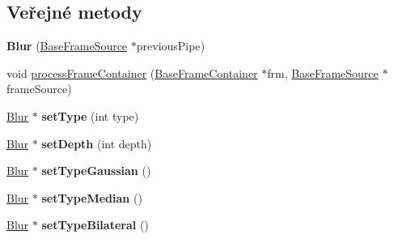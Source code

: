 \subsection*{Veřejné metody}
\begin{DoxyCompactItemize}
\item 
\hypertarget{class_ar_pipe_1_1_blur_a8f9e19aaa44b2333620ce10a70be6dc8}{{\bfseries Blur} (\hyperlink{class_ar_pipe_1_1_base_frame_source}{Base\-Frame\-Source} $\ast$previous\-Pipe)}\label{d1/df9/class_ar_pipe_1_1_blur_a8f9e19aaa44b2333620ce10a70be6dc8}

\item 
void \hyperlink{class_ar_pipe_1_1_blur_afd4bca524f1dff0d515308d7c22e93a9}{process\-Frame\-Container} (\hyperlink{class_ar_pipe_1_1_base_frame_container}{Base\-Frame\-Container} $\ast$frm, \hyperlink{class_ar_pipe_1_1_base_frame_source}{Base\-Frame\-Source} $\ast$frame\-Source)
\item 
\hypertarget{class_ar_pipe_1_1_blur_ac9a413eda8c4a52fa047c942788c3dd8}{\hyperlink{class_ar_pipe_1_1_blur}{Blur} $\ast$ {\bfseries set\-Type} (int type)}\label{d1/df9/class_ar_pipe_1_1_blur_ac9a413eda8c4a52fa047c942788c3dd8}

\item 
\hypertarget{class_ar_pipe_1_1_blur_a588e4beebabf621640f49528c3641435}{\hyperlink{class_ar_pipe_1_1_blur}{Blur} $\ast$ {\bfseries set\-Depth} (int depth)}\label{d1/df9/class_ar_pipe_1_1_blur_a588e4beebabf621640f49528c3641435}

\item 
\hypertarget{class_ar_pipe_1_1_blur_a9d2fc1475264e01315089bf84183509b}{\hyperlink{class_ar_pipe_1_1_blur}{Blur} $\ast$ {\bfseries set\-Type\-Gaussian} ()}\label{d1/df9/class_ar_pipe_1_1_blur_a9d2fc1475264e01315089bf84183509b}

\item 
\hypertarget{class_ar_pipe_1_1_blur_a9d0a0b03a56fb33e0200afb6d846c733}{\hyperlink{class_ar_pipe_1_1_blur}{Blur} $\ast$ {\bfseries set\-Type\-Median} ()}\label{d1/df9/class_ar_pipe_1_1_blur_a9d0a0b03a56fb33e0200afb6d846c733}

\item 
\hypertarget{class_ar_pipe_1_1_blur_a349fb13ca675d7d743d47722287ab33d}{\hyperlink{class_ar_pipe_1_1_blur}{Blur} $\ast$ {\bfseries set\-Type\-Bilateral} ()}\label{d1/df9/class_ar_pipe_1_1_blur_a349fb13ca675d7d743d47722287ab33d}

\end{DoxyCompactItemize}
